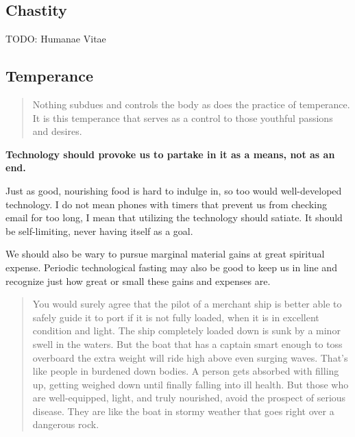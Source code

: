 \documentclass[letterpaper]{article}
\begin{document}
\subsection{Chastity}

TODO: Humanae Vitae

\hfill

\hfill

\hfill

\hfill

\hfill

\hfill

\hfill

\hfill



\subsection{Temperance}

\begin{quote}
  Nothing subdues and controls the body as does the practice of temperance. It is this temperance that serves as a control to those youthful passions and desires.
\end{quote}

\textbf{Technology should provoke us to partake in it as a means, not as an end.} 

Just as good, nourishing food is hard to indulge in, so too would well-developed technology. I do not mean phones with timers that prevent us from checking email for too long, I mean that utilizing the technology should satiate. It should be self-limiting, never having itself as a goal.

We should also be wary to pursue marginal material gains at great spiritual expense. Periodic technological fasting may also be good to keep us in line and recognize just how great or small these gains and expenses are.

\begin{quote}
  You would surely agree that the pilot of a merchant ship is better able to safely guide it to port if it is not fully loaded, when it is in excellent condition and light. The ship completely loaded down is sunk by a minor swell in the waters. But the boat that has a captain smart enough to toss overboard the extra weight will ride high above even surging waves.
  That’s like people in burdened down bodies. A person gets absorbed with filling up, getting weighed down until finally falling into ill health. But those who are well-equipped, light, and truly nourished, avoid the prospect of serious disease. They are like the boat in stormy weather that goes right over a dangerous rock.
\end{quote}
\end{document}
